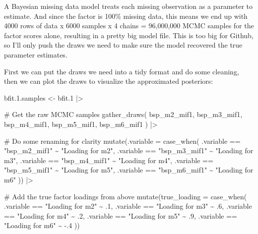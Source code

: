 \documentclass[
  letterpaper,
  DIV=11,
  numbers=noendperiod]{scrreprt}
\newenvironment{Shaded}{\begin{snugshade}}{\end{snugshade}}
\newcommand{\AttributeTok}[1]{\textcolor[rgb]{0.40,0.45,0.13}{#1}}
\newcommand{\CommentTok}[1]{\textcolor[rgb]{0.37,0.37,0.37}{#1}}
\newcommand{\DecValTok}[1]{\textcolor[rgb]{0.68,0.00,0.00}{#1}}
\newcommand{\FloatTok}[1]{\textcolor[rgb]{0.68,0.00,0.00}{#1}}
\newcommand{\FunctionTok}[1]{\textcolor[rgb]{0.28,0.35,0.67}{#1}}
\newcommand{\NormalTok}[1]{\textcolor[rgb]{0.00,0.23,0.31}{#1}}
\newcommand{\OtherTok}[1]{\textcolor[rgb]{0.00,0.23,0.31}{#1}}
\newcommand{\SpecialCharTok}[1]{\textcolor[rgb]{0.37,0.37,0.37}{#1}}
\newcommand{\StringTok}[1]{\textcolor[rgb]{0.13,0.47,0.30}{#1}}
\begin{document}
A Bayesian missing data model treats each missing observation as a
parameter to estimate. And since the factor is 100\% missing data, this
means we end up with 4000 rows of data x 6000 samples x 4 chains =
96,000,000 MCMC samples for the factor scores alone, resulting in a
pretty big model file. This is too big for Github, so I'll only push the
draws we need to make sure the model recovered the true parameter
estimates.

First we can put the draws we need into a tidy format and do some
cleaning, then we can plot the draws to visualize the approximated
posteriors:

\begin{Shaded}
\begin{Highlighting}[]
\NormalTok{bfit.}\FloatTok{1.}\NormalTok{samples }\OtherTok{\textless{}{-}}\NormalTok{ bfit}\FloatTok{.1} \SpecialCharTok{|\textgreater{}}

  \CommentTok{\# Get the raw MCMC samples}
  \FunctionTok{gather\_draws}\NormalTok{(}
\NormalTok{    bsp\_m2\_mif1,}
\NormalTok{    bsp\_m3\_mif1,}
\NormalTok{    bsp\_m4\_mif1,}
\NormalTok{    bsp\_m5\_mif1,}
\NormalTok{    bsp\_m6\_mif1}
\NormalTok{  ) }\SpecialCharTok{|\textgreater{}}

  \CommentTok{\# Do some renaming for clarity}
  \FunctionTok{mutate}\NormalTok{(}\AttributeTok{.variable =} \FunctionTok{case\_when}\NormalTok{(}
\NormalTok{    .variable }\SpecialCharTok{==} \StringTok{"bsp\_m2\_mif1"} \SpecialCharTok{\textasciitilde{}} \StringTok{"Loading for m2"}\NormalTok{,}
\NormalTok{    .variable }\SpecialCharTok{==} \StringTok{"bsp\_m3\_mif1"} \SpecialCharTok{\textasciitilde{}} \StringTok{"Loading for m3"}\NormalTok{,}
\NormalTok{    .variable }\SpecialCharTok{==} \StringTok{"bsp\_m4\_mif1"} \SpecialCharTok{\textasciitilde{}} \StringTok{"Loading for m4"}\NormalTok{,}
\NormalTok{    .variable }\SpecialCharTok{==} \StringTok{"bsp\_m5\_mif1"} \SpecialCharTok{\textasciitilde{}} \StringTok{"Loading for m5"}\NormalTok{,}
\NormalTok{    .variable }\SpecialCharTok{==} \StringTok{"bsp\_m6\_mif1"} \SpecialCharTok{\textasciitilde{}} \StringTok{"Loading for m6"}
\NormalTok{  )) }\SpecialCharTok{|\textgreater{}} 

  \CommentTok{\# Add the true factor loadings from above}
  \FunctionTok{mutate}\NormalTok{(}\AttributeTok{true\_loading =} \FunctionTok{case\_when}\NormalTok{(}
\NormalTok{    .variable }\SpecialCharTok{==} \StringTok{"Loading for m2"} \SpecialCharTok{\textasciitilde{}}\NormalTok{ .}\DecValTok{1}\NormalTok{,}
\NormalTok{    .variable }\SpecialCharTok{==} \StringTok{"Loading for m3"} \SpecialCharTok{\textasciitilde{}}\NormalTok{ .}\DecValTok{6}\NormalTok{,}
\NormalTok{    .variable }\SpecialCharTok{==} \StringTok{"Loading for m4"} \SpecialCharTok{\textasciitilde{}}\NormalTok{ .}\DecValTok{2}\NormalTok{,}
\NormalTok{    .variable }\SpecialCharTok{==} \StringTok{"Loading for m5"} \SpecialCharTok{\textasciitilde{}}\NormalTok{ .}\DecValTok{9}\NormalTok{,}
\NormalTok{    .variable }\SpecialCharTok{==} \StringTok{"Loading for m6"} \SpecialCharTok{\textasciitilde{}} \SpecialCharTok{{-}}\NormalTok{.}\DecValTok{4}
\NormalTok{  )) }


\end{Highlighting}
\end{Shaded}
\end{document}

